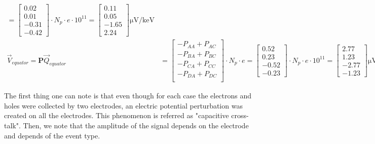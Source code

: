 \begin{align}
= 
\begin{bmatrix}
0.02 \\ 0.01 \\ -0.31 \\ -0.42
\end{bmatrix}
\cdot N_p \cdot e \cdot 10^{11}
= 
\begin{bmatrix}
0.11 \\ 0.05 \\ -1.65 \\ 2.24
\end{bmatrix}
\si{\micro\volt\per\kilo\eV}
\\
\vec{V}_{equator} = \bm{P} \vec{Q}_{equator} &=
\begin{bmatrix}
- P_{AA} + P_{AC} \\
- P_{BA} + P_{BC} \\
- P_{CA} + P_{CC} \\
- P_{DA} + P_{DC} \\
\end{bmatrix}
\cdot N_p \cdot e
= 
\begin{bmatrix}
0.52 \\ 0.23 \\ -0.52 \\ -0.23
\end{bmatrix}
\cdot N_p \cdot e \cdot 10^{11}
= 
\begin{bmatrix}
2.77 \\ 1.23 \\ -2.77 \\ -1.23
\end{bmatrix}
\si{\micro\volt\per\kilo\eV}
\end{align}

The first thing one can note is that even though for each case the electrons and holes were collected by two electrodes, an electric potential perturbation was created on all the electrodes. This phenomenon is referred as "capacitive cross-talk". Then, we note that the amplitude of the signal depends on the electrode and depends of the event type.

%
%

